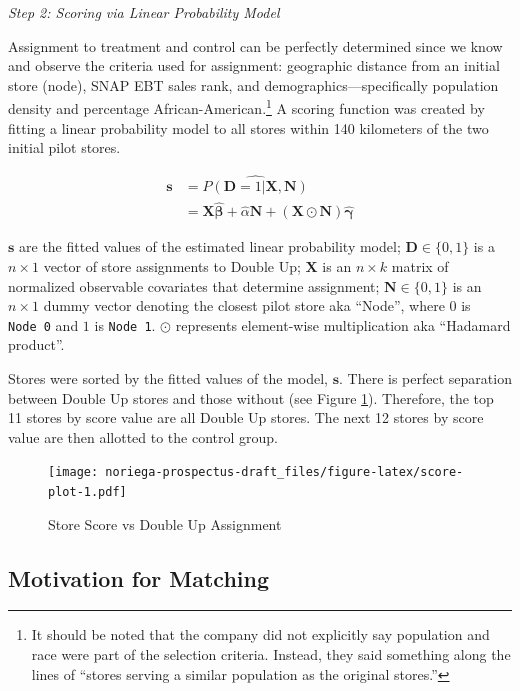 \documentclass[12pt,letterpaperpaper,]{book}
\begin{document}
\emph{Step 2: Scoring via Linear Probability Model}

Assignment to treatment and control can be perfectly determined since we
know and observe the criteria used for assignment: geographic distance
from an initial store (node), SNAP EBT sales rank, and
demographics---specifically population density and percentage
African-American.\footnote{It should be noted that the company did not
  explicitly say population and race were part of the selection
  criteria. Instead, they said something along the lines of ``stores
  serving a similar population as the original stores.''} A scoring
function was created by fitting a linear probability model to all stores
within 140 kilometers of the two initial pilot stores.

\[
\begin{aligned}
  \bm{s}  &= \widehat{P(\mathbf{D} = 1 | \bm{X}, \bm{N})} \\
          &= \mathbf{X} \bm{\hat \beta} + \hat \alpha \mathbf{N} + \left (\mathbf{X} \odot \mathbf{N} \right ) \bm{\hat \gamma}
\end{aligned}
\]

\(\bm{s}\) are the fitted values of the estimated linear probability
model; \(\mathbf{D} \in \{0,1 \}\) is a \(n \times 1\) vector of store
assignments to Double Up; \(\mathbf{X}\) is an \(n \times k\) matrix of
normalized observable covariates that determine assignment;
\(\mathbf{N} \in \{0, 1 \}\) is an \(n \times 1\) dummy vector denoting
the closest pilot store aka ``Node'', where \(0\) is \texttt{Node\ 0}
and \(1\) is \texttt{Node\ 1}. \(\odot\) represents element-wise
multiplication aka ``Hadamard product''.

Stores were sorted by the fitted values of the model, \(\bm{s}\). There
is perfect separation between Double Up stores and those without (see
Figure \ref{fig:score-plot}). Therefore, the top 11 stores by score
value are all Double Up stores. The next 12 stores by score value are
then allotted to the control group.

\begin{figure}
\centering
\texttt{[image: noriega-prospectus-draft\_files/figure-latex/score-plot-1.pdf]}
\caption{\label{fig:score-plot}Store Score vs Double Up Assignment}
\end{figure}

\subsection*{Motivation for Matching}\label{motivation-for-matching}
\end{document}
